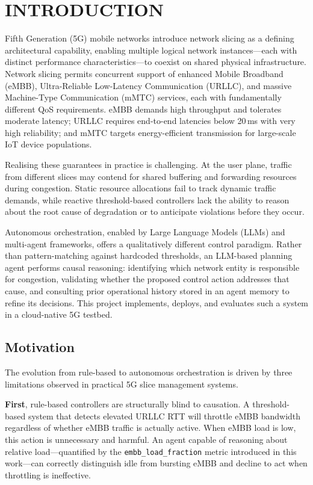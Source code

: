 
\chapter{INTRODUCTION}

Fifth Generation (5G) mobile networks introduce network slicing as a defining architectural capability, enabling multiple logical network instances---each with distinct performance characteristics---to coexist on shared physical infrastructure. Network slicing permits concurrent support of enhanced Mobile Broadband (eMBB), Ultra-Reliable Low-Latency Communication (URLLC), and massive Machine-Type Communication (mMTC) services, each with fundamentally different QoS requirements. eMBB demands high throughput and tolerates moderate latency; URLLC requires end-to-end latencies below 20\,ms with very high reliability; and mMTC targets energy-efficient transmission for large-scale IoT device populations.

Realising these guarantees in practice is challenging. At the user plane, traffic from different slices may contend for shared buffering and forwarding resources during congestion. Static resource allocations fail to track dynamic traffic demands, while reactive threshold-based controllers lack the ability to reason about the root cause of degradation or to anticipate violations before they occur.

Autonomous orchestration, enabled by Large Language Models (LLMs) and multi-agent frameworks, offers a qualitatively different control paradigm. Rather than pattern-matching against hardcoded thresholds, an LLM-based planning agent performs causal reasoning: identifying which network entity is responsible for congestion, validating whether the proposed control action addresses that cause, and consulting prior operational history stored in an agent memory to refine its decisions. This project implements, deploys, and evaluates such a system in a cloud-native 5G testbed.

\section{Motivation}

The evolution from rule-based to autonomous orchestration is driven by three limitations observed in practical 5G slice management systems.

\textbf{First}, rule-based controllers are structurally blind to causation. A threshold-based system that detects elevated URLLC RTT will throttle eMBB bandwidth regardless of whether eMBB traffic is actually active. When eMBB load is low, this action is unnecessary and harmful. An agent capable of reasoning about relative load---quantified by the \texttt{embb\_load\_fraction} metric introduced in this work---can correctly distinguish idle from bursting eMBB and decline to act when throttling is ineffective.

